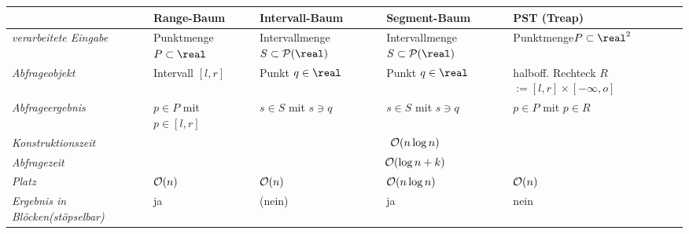 {\footnotesize
\begin{tabular}{p{32mm}p{29mm}p{29mm}p{29mm}p{29mm}}
    \toprule
    &
    \textbf{Range-Baum}&
    \textbf{Intervall-Baum}&
    \textbf{Segment-Baum}&
    \textbf{PST (Treap)}\\

    \midrule
    \emph{verarbeitete Eingabe}&
    Punktmenge\newline$P \subset \real$&
    Intervallmenge\newline$S \subset \P(\real)$&
    Intervallmenge\newline$S \subset \P(\real)$&
    Punktmenge\newline$P \subset \real^2$\\

    \midrule
    \emph{Abfrageobjekt}&
    Intervall $[l, r]$&
    Punkt $q \in \real$&
    Punkt $q \in \real$&
    halboff. Rechteck $R$\newline$:= [l, r] \times [-\infty, o]$\\

    \midrule
    \emph{Abfrageergebnis}&
    $p \in P$ mit $p \in [l, r]$&
    $s \in S$ mit $s \ni q$&
    $s \in S$ mit $s \ni q$&
    $p \in P$ mit $p \in R$\\

    \midrule
    \emph{Konstruktionszeit}&
    \multicolumn{4}{c}{$\mathcal{O}(n \log n)$}\\

    \midrule
    \emph{Abfragezeit}&
    \multicolumn{4}{c}{$\mathcal{O}(\log n + k)$}\\

    \midrule
    \emph{Platz}&
    $\mathcal{O}(n)$&
    $\mathcal{O}(n)$&
    $\mathcal{O}(n \log n)$&
    $\mathcal{O}(n)$\\

    \midrule
    \emph{Ergebnis in Blöcken\newline(stöpselbar)}&
    ja&
    (nein)&
    ja&
    nein\\

    \bottomrule
\end{tabular}}

\pagebreak
